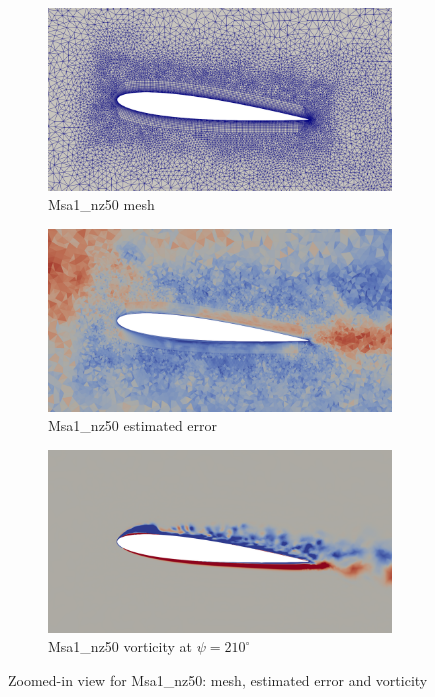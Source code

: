 \begin{figure}[H]
	\centering
	\begin{subfigure}[b]{0.7\textwidth}
		\centering
		\includegraphics[width=1\textwidth]{figures/adapt_strat/zoomed/Msa1_mesh.png}
		\caption{Msa1\_nz50 mesh}
		\label{fig:Msa1_mesh_zoomed}
	\end{subfigure}
	\begin{subfigure}[b]{0.7\textwidth}
		\centering
		\includegraphics[width=1\textwidth]{figures/adapt_strat/zoomed/Msa1_error.png}
		\caption{Msa1\_nz50 estimated error}
		\label{fig:Msa1_max_error_zoomed}
	\end{subfigure}
	\begin{subfigure}[b]{0.7\textwidth}
		\centering
		\includegraphics[width=1\textwidth]{figures/adapt_strat/zoomed/Msa1_ph_210.png}
		\caption{Msa1\_nz50 vorticity at $\psi=210^\circ$}
		\label{fig:Msa1_vorticity_zoomed}
	\end{subfigure}
	\caption{Zoomed-in view for Msa1\_nz50: mesh, estimated error and vorticity}
	\label{fig:Msa1_zoomed}
\end{figure}


